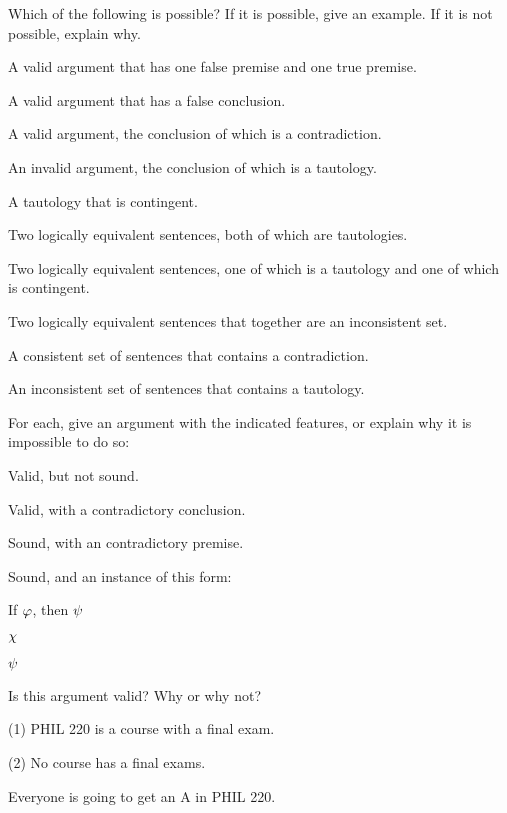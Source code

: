 \solutions
\problempart
\label{pr.EnglishCombinations}
Which of the following is possible? If it is possible, give an example. If it is not possible, explain why.
\begin{earg}
\item A valid argument that has one false premise and one true premise.
\item A valid argument that has a false conclusion.
\item A valid argument, the conclusion of which is a contradiction.
\item An invalid argument, the conclusion of which is a tautology.
\item A tautology that is contingent.
\item Two logically equivalent sentences, both of which are tautologies.
\item Two logically equivalent sentences, one of which is a tautology and one of which is contingent.
\item Two logically equivalent sentences that together are an inconsistent set.
\item A consistent set of sentences that contains a contradiction.
\item An inconsistent set of sentences that contains a tautology.
\end{earg}


\problempart
\label{hw1.C}
For each, give an argument with the indicated features, or explain why it is impossible to do so:
	\begin{earg}
		\item Valid, but not sound.
		\item Valid, with a contradictory conclusion.
		\item Sound, with an contradictory premise.
		\item Sound, and an instance of this form:
			\begin{earg}
        \item[] If $\varphi$, then $\psi$
        \item[] $\chi$
        \item[\therefore] $\psi$
			\end{earg}
	\end{earg}


\problempart
\label{pr.ImpossiblePremises}
Is this argument valid? Why or why not?
\begin{earg}
\item[(1)] PHIL 220 is a course with a final exam.
\item[(2)] No course has a final exams.
\item[\therefore] Everyone is going to get an A in PHIL 220.
\end{earg}

